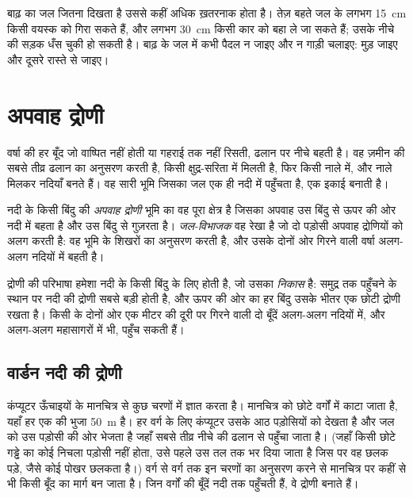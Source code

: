 \begin{safety}
बाढ़ का जल जितना दिखता है उससे कहीं अधिक ख़तरनाक होता है। तेज़ बहते जल के लगभग \qty{15}{cm}
किसी वयस्क को गिरा सकते हैं, और लगभग \qty{30}{cm} किसी
कार को बहा ले जा सकते हैं; उसके नीचे की सड़क धँस चुकी हो सकती है। बाढ़ के जल में कभी पैदल न
जाइए और न गाड़ी चलाइए: मुड़ जाइए और दूसरे रास्ते से जाइए।
\end{safety}

\section{अपवाह द्रोणी}

वर्षा की हर बूँद जो वाष्पित नहीं होती या गहराई तक नहीं रिसती, ढलान पर नीचे बहती है।
वह ज़मीन की सबसे तीव्र ढलान का अनुसरण करती है, किसी क्षुद्र-सरिता में मिलती है, फिर किसी नाले में,
और नाले मिलकर नदियाँ बनते हैं। वह सारी भूमि जिसका जल एक ही
नदी में पहुँचता है, एक इकाई बनाती है।

\begin{definition}[अपवाह द्रोणी; जल-विभाजक]\label{def:g10:drainage-basins:drainage-basin}
नदी के किसी बिंदु की \emph{अपवाह द्रोणी}
भूमि का वह पूरा क्षेत्र है जिसका अपवाह उस बिंदु से ऊपर की ओर नदी में बहता है और
उस बिंदु से गुज़रता है।
\emph{जल-विभाजक} वह रेखा है जो दो पड़ोसी अपवाह द्रोणियों को अलग करती है: वह
भूमि के शिखरों का अनुसरण करती है, और उसके दोनों ओर गिरने वाली वर्षा
अलग-अलग नदियों में बहती है।
\end{definition}

द्रोणी की परिभाषा हमेशा नदी के किसी बिंदु के लिए होती है, जो उसका \emph{निकास} है:
समुद्र तक पहुँचने के स्थान पर नदी की द्रोणी सबसे बड़ी होती है, और ऊपर की ओर का हर बिंदु
उसके भीतर एक छोटी द्रोणी रखता है। किसी  के दोनों ओर एक मीटर की दूरी पर
गिरने वाली दो बूँदें अलग-अलग नदियों में, और अलग-अलग
महासागरों में भी, पहुँच सकती हैं।

\subsection*{वार्डन नदी की द्रोणी}

कंप्यूटर ऊँचाइयों के मानचित्र से कुछ चरणों में  ज्ञात करता है।
मानचित्र को छोटे वर्गों में काटा जाता है, यहाँ हर एक की भुजा \qty{50}{m} है। हर वर्ग के लिए
कंप्यूटर उसके आठ पड़ोसियों को देखता है और जल को उस पड़ोसी की ओर भेजता है
जहाँ सबसे तीव्र नीचे की ढलान से पहुँचा जाता है। (जहाँ किसी छोटे गड्ढे का कोई निचला
पड़ोसी नहीं होता, उसे पहले उस तल तक भर दिया जाता है जिस पर वह छलक पड़े, जैसे
कोई पोखर छलकता है।) वर्ग से वर्ग तक इन चरणों का अनुसरण करने से मानचित्र पर कहीं से भी
किसी बूँद का मार्ग बन जाता है। जिन वर्गों की बूँदें नदी तक पहुँचती हैं, वे
द्रोणी बनाते हैं।

